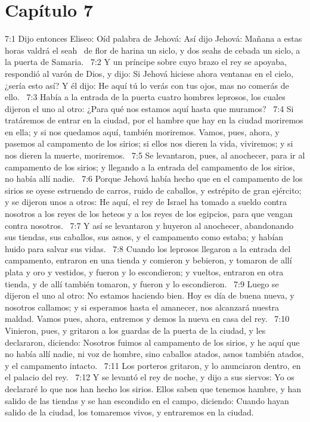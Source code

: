 \section*{Capítulo 7 }
7:1 Dijo entonces Eliseo: Oíd palabra de Jehová: Así dijo Jehová: Mañana a estas horas valdrá el seah  de flor de harina un siclo, y dos seahs de cebada un siclo, a la puerta de Samaria.  
7:2 Y un príncipe sobre cuyo brazo el rey se apoyaba, respondió al varón de Dios, y dijo: Si Jehová hiciese ahora ventanas en el cielo, ¿sería esto así? Y él dijo: He aquí tú lo verás con tus ojos, mas no comerás de ello.  
7:3 Había a la entrada de la puerta cuatro hombres leprosos, los cuales dijeron el uno al otro: ¿Para qué nos estamos aquí hasta que muramos?  
7:4 Si tratáremos de entrar en la ciudad, por el hambre que hay en la ciudad moriremos en ella; y si nos quedamos aquí, también moriremos. Vamos, pues, ahora, y pasemos al campamento de los sirios; si ellos nos dieren la vida, viviremos; y si nos dieren la muerte, moriremos.  
7:5 Se levantaron, pues, al anochecer, para ir al campamento de los sirios; y llegando a la entrada del campamento de los sirios, no había allí nadie.  
7:6 Porque Jehová había hecho que en el campamento de los sirios se oyese estruendo de carros, ruido de caballos, y estrépito de gran ejército; y se dijeron unos a otros: He aquí, el rey de Israel ha tomado a sueldo contra nosotros a los reyes de los heteos y a los reyes de los egipcios, para que vengan contra nosotros.  
7:7 Y así se levantaron y huyeron al anochecer, abandonando sus tiendas, sus caballos, sus asnos, y el campamento como estaba; y habían huido para salvar sus vidas.  
7:8 Cuando los leprosos llegaron a la entrada del campamento, entraron en una tienda y comieron y bebieron, y tomaron de allí plata y oro y vestidos, y fueron y lo escondieron; y vueltos, entraron en otra tienda, y de allí también tomaron, y fueron y lo escondieron.  
7:9 Luego se dijeron el uno al otro: No estamos haciendo bien. Hoy es día de buena nueva, y nosotros callamos; y si esperamos hasta el amanecer, nos alcanzará nuestra maldad. Vamos pues, ahora, entremos y demos la nueva en casa del rey.  
7:10 Vinieron, pues, y gritaron a los guardas de la puerta de la ciudad, y les declararon, diciendo: Nosotros fuimos al campamento de los sirios, y he aquí que no había allí nadie, ni voz de hombre, sino caballos atados, asnos también atados, y el campamento intacto.  
7:11 Los porteros gritaron, y lo anunciaron dentro, en el palacio del rey.  
7:12 Y se levantó el rey de noche, y dijo a sus siervos: Yo os declararé lo que nos han hecho los sirios. Ellos saben que tenemos hambre, y han salido de las tiendas y se han escondido en el campo, diciendo: Cuando hayan salido de la ciudad, los tomaremos vivos, y entraremos en la ciudad.  
